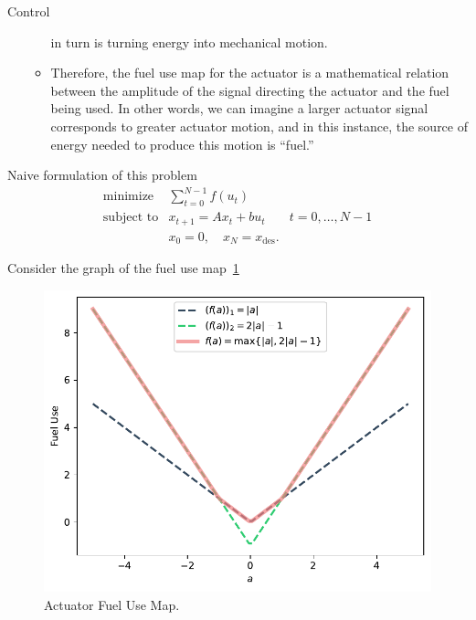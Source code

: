 \begin{chapter}{Control}
\begin{itemize}
\begin{itemize}
                    in turn is turning energy into mechanical motion.
                    \item Therefore, the fuel use map for the actuator is a mathematical
                    relation between the amplitude of the signal directing the actuator and
                    the fuel being used. In other words, we can imagine a larger actuator
                    signal corresponds to greater actuator motion, and in this instance,
                    the source of energy needed to produce this motion is ``fuel.''
                \end{itemize}
        \end{itemize}
     Naive formulation of this problem 
    \[\begin{array}{lll}
    \text{minimize} \; & \sum_{t=0}^{N-1} f(u_t) & \\
    \text{subject to} & x_{t+1} = Ax_t + bu_t \; & t=0, \ldots, N-1 \\
    & x_0 = 0, \quad x_{N} = x_{\text{des}}.
    \end{array}\]
    
    Consider the graph of the fuel use map~\ref{fig:fuel-map}

    \begin{figure}[h]
        \centering
        \includegraphics[width=\linewidth]{examples/cvx-ch4/actuator_fuel-use.pdf}
        \caption{Actuator Fuel Use Map.}
        \label{fig:fuel-map}
    \end{figure}


\end{chapter}
